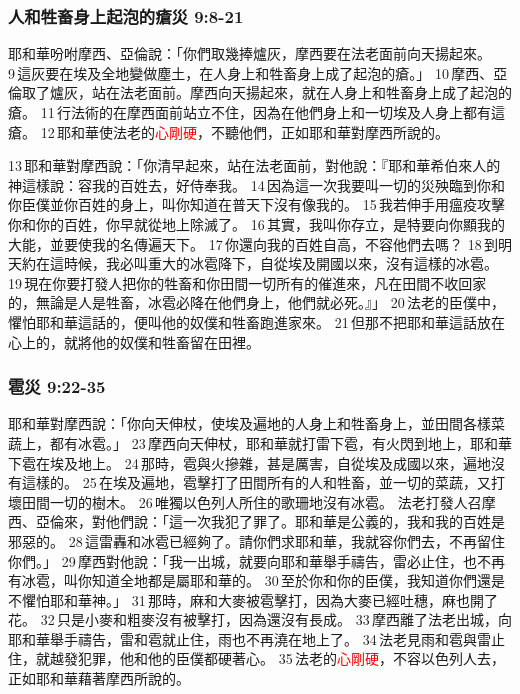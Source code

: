 \subsubsection{人和牲畜身上起泡的瘡災 9:8-21}
耶和華吩咐摩西、亞倫說：「你們取幾捧爐灰，摩西要在法老面前向天揚起來。 9 這灰要在埃及全地變做塵土，在人身上和牲畜身上成了起泡的瘡。」 10 摩西、亞倫取了爐灰，站在法老面前。摩西向天揚起來，就在人身上和牲畜身上成了起泡的瘡。 11 行法術的在摩西面前站立不住，因為在他們身上和一切埃及人身上都有這瘡。 12 耶和華使法老的\textcolor{red}{心剛硬}，不聽他們，正如耶和華對摩西所說的。

13 耶和華對摩西說：「你清早起來，站在法老面前，對他說：『耶和華希伯來人的神這樣說：容我的百姓去，好侍奉我。 14 因為這一次我要叫一切的災殃臨到你和你臣僕並你百姓的身上，叫你知道在普天下沒有像我的。 15 我若伸手用瘟疫攻擊你和你的百姓，你早就從地上除滅了。 16 其實，我叫你存立，是特要向你顯我的大能，並要使我的名傳遍天下。 17 你還向我的百姓自高，不容他們去嗎？ 18 到明天約在這時候，我必叫重大的冰雹降下，自從埃及開國以來，沒有這樣的冰雹。 19 現在你要打發人把你的牲畜和你田間一切所有的催進來，凡在田間不收回家的，無論是人是牲畜，冰雹必降在他們身上，他們就必死。』」 20 法老的臣僕中，懼怕耶和華這話的，便叫他的奴僕和牲畜跑進家來。 21 但那不把耶和華這話放在心上的，就將他的奴僕和牲畜留在田裡。


\subsubsection{雹災 9:22-35}
耶和華對摩西說：「你向天伸杖，使埃及遍地的人身上和牲畜身上，並田間各樣菜蔬上，都有冰雹。」 23 摩西向天伸杖，耶和華就打雷下雹，有火閃到地上，耶和華下雹在埃及地上。 24 那時，雹與火摻雜，甚是厲害，自從埃及成國以來，遍地沒有這樣的。 25 在埃及遍地，雹擊打了田間所有的人和牲畜，並一切的菜蔬，又打壞田間一切的樹木。 26 唯獨以色列人所住的歌珊地沒有冰雹。
法老打發人召摩西、亞倫來，對他們說：「這一次我犯了罪了。耶和華是公義的，我和我的百姓是邪惡的。 28 這雷轟和冰雹已經夠了。請你們求耶和華，我就容你們去，不再留住你們。」 29 摩西對他說：「我一出城，就要向耶和華舉手禱告，雷必止住，也不再有冰雹，叫你知道全地都是屬耶和華的。 30 至於你和你的臣僕，我知道你們還是不懼怕耶和華神。」 31 那時，麻和大麥被雹擊打，因為大麥已經吐穗，麻也開了花。 32 只是小麥和粗麥沒有被擊打，因為還沒有長成。 33 摩西離了法老出城，向耶和華舉手禱告，雷和雹就止住，雨也不再澆在地上了。 34 法老見雨和雹與雷止住，就越發犯罪，他和他的臣僕都硬著心。 35 法老的\textcolor{red}{心剛硬}，不容以色列人去，正如耶和華藉著摩西所說的。

